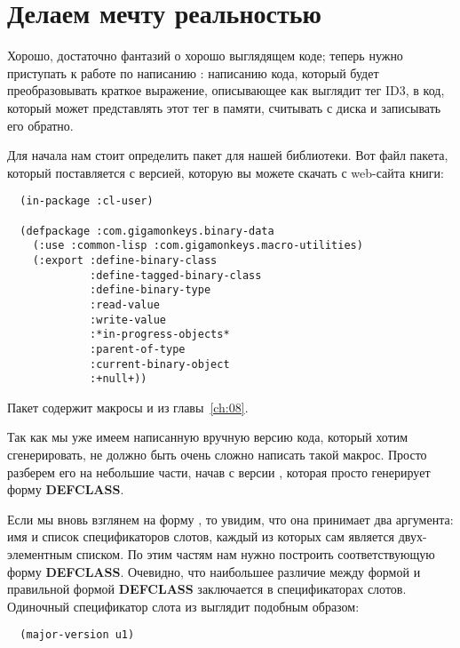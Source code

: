 \section{Делаем мечту реальностью}

Хорошо, достаточно фантазий о хорошо выглядящем коде; теперь нужно приступать к работе по
написанию : написанию кода, который будет преобразовывать
краткое выражение, описывающее как выглядит тег ID3, в код, который может представлять
этот тег в памяти, считывать с диска и записывать его обратно.

Для начала нам стоит определить пакет для нашей библиотеки. Вот файл пакета, который
поставляется с версией, которую вы можете скачать с web-сайта книги:%

\begin{lstlisting}
  (in-package :cl-user)

  (defpackage :com.gigamonkeys.binary-data
    (:use :common-lisp :com.gigamonkeys.macro-utilities)
    (:export :define-binary-class
             :define-tagged-binary-class
             :define-binary-type
             :read-value
             :write-value
             :*in-progress-objects*
             :parent-of-type
             :current-binary-object
             :+null+))
\end{lstlisting}

Пакет  содержит макросы  и
 из главы~\ref{ch:08}.

Так как мы уже имеем написанную вручную версию кода, который хотим сгенерировать, не
должно быть очень сложно написать такой макрос. Просто разберем его на небольшие части,
начав с версии , которая просто генерирует форму
\textbf{DEFCLASS}.

Если мы вновь взглянем на форму , то увидим, что она принимает
два аргумента: имя  и список спецификаторов слотов, каждый из которых сам
является двух-элементным списком. По этим частям нам нужно построить соответствующую форму
\textbf{DEFCLASS}. Очевидно, что наибольшее различие между формой
 и правильной формой \textbf{DEFCLASS} заключается в
спецификаторах слотов. Одиночный спецификатор слота из  выглядит
подобным образом:

\begin{lstlisting}
  (major-version u1)
\end{lstlisting}

